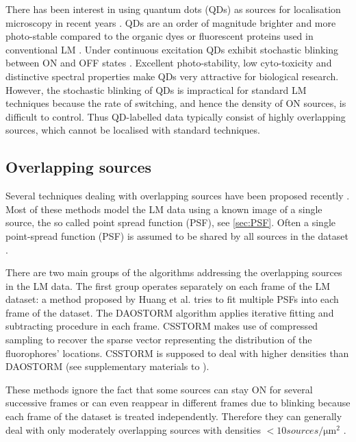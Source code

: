 There has been interest in using quantum dots (QDs) as sources for localisation microscopy in recent years \cite{Lidke2005,Lidke2007,Harrington2008,Simonson2011}. QDs are an order of magnitude brighter and more photo-stable compared to the organic dyes or fluorescent proteins used in conventional LM \cite{Resch-Genger2008}. Under continuous excitation QDs exhibit stochastic blinking between ON and OFF states \cite{Kuno2001,Stefani2009}. Excellent photo-stability, low cyto-toxicity and distinctive spectral properties make QDs very attractive for biological research. However, the stochastic blinking of QDs is impractical for standard LM techniques because the rate of switching, and hence the density of ON sources, is difficult to control. Thus QD-labelled data typically consist of highly overlapping sources, which cannot be localised with standard techniques.


\subsection{Overlapping sources\label{sec:Overlapping sources}}

Several techniques dealing with overlapping sources have been proposed recently \cite{Lidke2005,Harrington2008,Huang2011,Holden2011,Cox2011,Zhu2012}. Most of these methods model the LM data using a known image of a single source, the so called point spread function (PSF), see \autoref{sec:PSF}. Often a single point-spread function (PSF) is assumed to be shared by all sources in the dataset \cite{Harrington2008,Huang2011,Holden2011,Cox2011,Zhu2012}.

There are two main groups of the algorithms addressing the overlapping sources in the LM data. The first group operates separately on each frame of the LM dataset: a method proposed by Huang et al. \cite{Huang2011} tries to fit multiple PSFs into each frame of the dataset. The DAOSTORM algorithm \cite{Holden2011} applies iterative fitting and subtracting procedure in each frame.  CSSTORM \cite{Zhu2012} makes use of compressed sampling to recover the sparse vector representing the distribution of the fluorophores' locations. CSSTORM is supposed to deal with higher densities than DAOSTORM (see supplementary materials to \cite{Zhu2012}).

These methods ignore the fact that some sources can stay ON for several successive frames or can even reappear in different frames due to blinking because each frame of the dataset is treated independently. Therefore they can generally deal with only moderately overlapping sources with densities $<10\unit{sources/\um^2}$ \cite{Huang2011,Holden2011,Zhu2012}.

